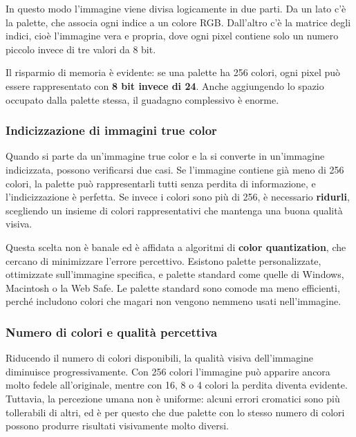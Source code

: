 \documentclass[
]{article}
\begin{document}
In questo modo l'immagine viene divisa logicamente in due parti. Da un lato c'è la palette, che associa ogni indice a un colore RGB. Dall'altro c'è la matrice degli indici, cioè l'immagine vera e propria, dove ogni pixel contiene solo un numero piccolo invece di tre valori da 8 bit.

Il risparmio di memoria è evidente: se una palette ha 256 colori, ogni pixel può essere rappresentato con \textbf{8 bit invece di 24}. Anche aggiungendo lo spazio occupato dalla palette stessa, il guadagno complessivo è enorme.

\hypertarget{indicizzazione-di-immagini-true-color}{%
\subsubsection{\texorpdfstring{\textbf{Indicizzazione di immagini true color}}{Indicizzazione di immagini true color}}\label{indicizzazione-di-immagini-true-color}}

Quando si parte da un'immagine true color e la si converte in un'immagine indicizzata, possono verificarsi due casi. Se l'immagine contiene già meno di 256 colori, la palette può rappresentarli tutti senza perdita di informazione, e l'indicizzazione è perfetta. Se invece i colori sono più di 256, è necessario \textbf{ridurli}, scegliendo un insieme di colori rappresentativi che mantenga una buona qualità visiva.

Questa scelta non è banale ed è affidata a algoritmi di \textbf{color quantization}, che cercano di minimizzare l'errore percettivo. Esistono palette personalizzate, ottimizzate sull'immagine specifica, e palette standard come quelle di Windows, Macintosh o la Web Safe. Le palette standard sono comode ma meno efficienti, perché includono colori che magari non vengono nemmeno usati nell'immagine.

\hypertarget{numero-di-colori-e-qualituxe0-percettiva}{%
\subsubsection{\texorpdfstring{\textbf{Numero di colori e qualità percettiva}}{Numero di colori e qualità percettiva}}\label{numero-di-colori-e-qualituxe0-percettiva}}

Riducendo il numero di colori disponibili, la qualità visiva dell'immagine diminuisce progressivamente. Con 256 colori l'immagine può apparire ancora molto fedele all'originale, mentre con 16, 8 o 4 colori la perdita diventa evidente. Tuttavia, la percezione umana non è uniforme: alcuni errori cromatici sono più tollerabili di altri, ed è per questo che due palette con lo stesso numero di colori possono produrre risultati visivamente molto diversi.
\end{document}
